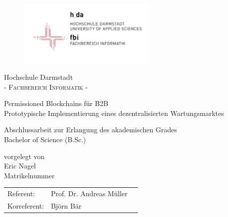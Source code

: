 \pagestyle{empty} %

\begin{figure}[t]
	\centering
	\includegraphics[width=0.6\textwidth]{images/logo_fbi}
\end{figure}


\begin{center}
\Large Hochschule Darmstadt \\
\normalsize \textsc{- Fachbereich Informatik -} \\

\vspace{80 pt}

\Huge Permissioned Blockchains für B2B \\ 
\Large Prototypische Implementierung eines dezentralisierten Wartungsmarktes \\
\normalsize
\vspace{20 pt}

Abschlussarbeit zur Erlangung des akademischen Grades \\ 
Bachelor of Science (B.Sc.) 

\vspace{75 pt}


vorgelegt von \\
\vspace{5 pt}
Eric Nagel \\
Matrikelnummer
\vspace{80 pt}

\begin{tabular}[h]{p{4cm}l l}
	Referent: & Prof. Dr. Andreas Müller \\
	Korreferent: & Björn Bär
\end{tabular}


\end{center}
